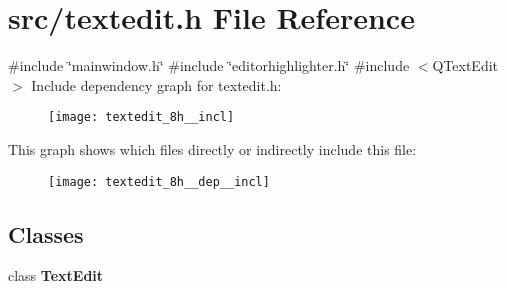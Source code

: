 \section{src/textedit.h File Reference}
\label{textedit_8h}
{\ttfamily \#include \char`\"{}mainwindow.\+h\char`\"{}}\newline
{\ttfamily \#include \char`\"{}editorhighlighter.\+h\char`\"{}}\newline
{\ttfamily \#include $<$Q\+Text\+Edit$>$}\newline
Include dependency graph for textedit.\+h\+:\nopagebreak
\begin{figure}[H]
\begin{center}
\leavevmode
\texttt{[image: textedit\_8h\_\_incl]}
\end{center}
\end{figure}
This graph shows which files directly or indirectly include this file\+:\nopagebreak
\begin{figure}[H]
\begin{center}
\leavevmode
\texttt{[image: textedit\_8h\_\_dep\_\_incl]}
\end{center}
\end{figure}
\subsection*{Classes}
\begin{DoxyCompactItemize}
\item 
class \textbf{ Text\+Edit}
\end{DoxyCompactItemize}
